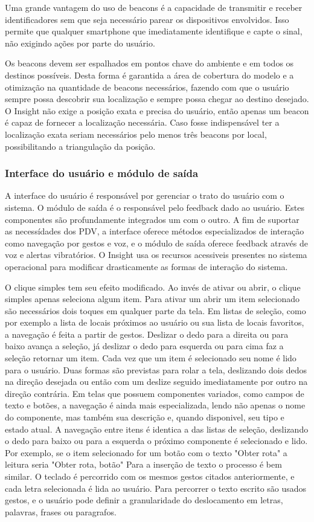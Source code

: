 \documentclass[english,brazilian]{UNISINOSmonografia}
\begin{document}
Uma grande vantagem do uso de beacons é a capacidade de transmitir e receber identificadores sem que seja necessário parear os dispositivos envolvidos. Isso permite que qualquer smartphone que imediatamente identifique e capte o sinal, não exigindo ações por parte do usuário.

Os beacons devem ser espalhados em pontos chave do ambiente e em todos os destinos possíveis. Desta forma é garantida a área de cobertura do modelo e a otimização na quantidade de beacons necessários, fazendo com que o usuário sempre possa descobrir sua localização e sempre possa chegar ao destino desejado. O Insight não exige a posição exata e precisa do usuário, então apenas um beacon é capaz de fornecer a localização necessária. Caso fosse indispensável ter a localização exata seriam necessários pelo menos três beacons por local, possibilitando a triangulação da posição.

	\subsubsection{Interface do usuário e módulo de saída}
A interface do usuário é responsável por gerenciar o trato do usuário com o sistema. O módulo de saída é o responsável pelo feedback dado ao usuário. Estes componentes são profundamente integrados um com o outro. A fim de suportar as necessídades dos PDV, a interface oferece métodos especializados de interação como navegação por gestos e voz, e o módulo de saída oferece feedback através de voz e alertas vibratórios. 
O Insight usa os recursos acessiveis presentes no sistema operacional para modificar drasticamente as formas de interação do sistema. 

O clique simples tem seu efeito modificado. Ao invés de ativar ou abrir, o clique simples apenas seleciona algum item. Para ativar um abrir um item selecionado são necessários dois toques em qualquer parte da tela. Em listas de seleção, como por exemplo a lista de locais próximos ao usuário ou sua lista de locais favoritos, a navegação é feita a partir de gestos. Deslizar o dedo para a direita ou para baixo avança a seleção, já deslizar o dedo para esquerda ou para cima faz a seleção retornar um item. Cada vez que um item é selecionado seu nome é lido para o usuário. Duas formas são previstas para rolar a tela, deslizando dois dedos na direção desejada ou então com um deslize seguido imediatamente por outro na direção contrária. Em telas que possuem componentes variados, como campos de texto e botões, a navegação é ainda mais especializada, lendo não apenas o nome do componente, mas também sua descrição e, quando disponivel, seu tipo e estado atual. A navegação entre itens é identica a das listas de seleção, deslizando o dedo para baixo ou para a esquerda o próximo componente é selecionado e lido. Por exemplo, se o item selecionado for um botão com o texto "Obter rota" a leitura seria "Obter rota, botão"
Para a inserção de texto o processo é bem similar. O teclado é percorrido com os mesmos gestos citados anteriormente, e cada letra selecionada é lida ao usuário. Para percorrer o texto escrito são usados gestos, e o usuário pode definir a granularidade do deslocamento em letras, palavras, frases ou paragrafos.
\end{document}
